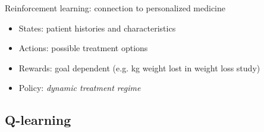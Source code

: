 \documentclass{beamer}
\begin{document}
\begin{frame}[c]{Reinforcement learning: connection to personalized medicine}
  
  \begin{itemize}[<+->]
      \item States: patient histories and characteristics
      \item Actions: possible treatment options
      \item Rewards: goal dependent (e.g. kg weight lost in weight loss study)
      \item Policy: \emph{dynamic treatment regime} 
  \end{itemize}

\end{frame}

\subsection{Q-learning} %
\label{sub:q_learning}
\end{document}
